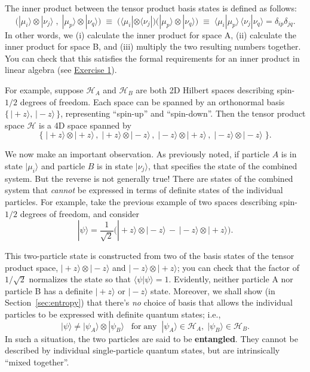 \documentclass[pra,12pt]{revtex4}
\begin{document}
The inner product between the tensor product basis states is defined
as follows:
\begin{equation}
  \Big(|\mu_i\rangle \otimes |\nu_j\rangle\;,\; |\mu_p\rangle \otimes |\nu_q\rangle \Big) \;\equiv\; \Big(\langle\mu_i| \otimes \langle\nu_j| \Big) \Big(|\mu_p\rangle \otimes |\nu_q\rangle\Big) \;\equiv\; \langle\mu_i|\mu_p\rangle \, \langle\nu_j|\nu_q\rangle = \delta_{ip}\delta_{jq}.
\end{equation}
In other words, we (i) calculate the inner product for space A, (ii)
calculate the inner product for space B, and (iii) multiply the two
resulting numbers together.  You can check that this satisfies the
formal requirements for an inner product in linear algebra (see
\hyperref[ex:innerprod]{Exercise 1}).

For example, suppose $\mathscr{H}_A$ and $\mathscr{H}_B$ are both 2D
Hilbert spaces describing spin-$1/2$ degrees of freedom.  Each space
can be spanned by an orthonormal basis $\{\,|\!+\!z\rangle,
\,|\!-\!z\rangle \, \}$, representing ``spin-up'' and ``spin-down''.
Then the tensor product space $\mathscr{H}$ is a 4D space spanned by
\begin{equation*}
  \Big\{\;|\!+\!z\rangle\otimes|\!+\!z\rangle\,,\; |\!+\!z\rangle\otimes|\!-\!z\rangle\,,\; |\!-z\!\rangle\otimes|\!+\!z\rangle\,,\; |\!-\!z\rangle\otimes|\!-\!z\rangle \;\Big\}.
\end{equation*}

We now make an important observation.  As previously noted, if
particle $A$ is in state $|\mu_i\rangle$ and particle $B$ is in state
$|\nu_j\rangle$, that specifies the state of the combined system.  But
the reverse is not generally true!  There are states of the combined
system that \textit{cannot} be expressed in terms of definite states
of the individual particles.  For example, take the previous example
of two spaces describing spin-$1/2$ degrees of freedom, and consider
\begin{equation}
  |\psi\rangle = \frac{1}{\sqrt{2}} \Big(|\!+\!z\rangle\otimes|\!-\!z\rangle \,-\, |\!-\!z\rangle\otimes|\!+\!z\rangle\Big).
\end{equation}

This two-particle state is constructed from two of the basis states of
the tensor product space, $|\!+\!z\rangle\otimes|\!-\!z\rangle$ and
$|\!-\!z\rangle\otimes|\!+\!z\rangle$; you can check that the factor
of $1/\sqrt{2}$ normalizes the state so that $\langle\psi|\psi\rangle
= 1$.  Evidently, neither particle A nor particle B has a definite
$|\!+\!z\rangle$ or $|\!-\!z\rangle$ state.  Moreover, we shall show
(in Section~\ref{sec:entropy}) that there's \textit{no} choice of
basis that allows the individual particles to be expressed with
definite quantum states; i.e.,
\begin{equation}
  |\psi\rangle \ne |\psi_A\rangle\otimes|\psi_B\rangle \;\;\;\textrm{for}\;\textrm{any}\;\; |\psi_A\rangle \in \mathscr{H}_A, \;|\psi_B\rangle \in \mathscr{H}_B.
\end{equation}
In such a situation, the two particles are said to be
\textbf{entangled}.  They cannot be described by individual
single-particle quantum states, but are intrinsically ``mixed
together''.
\end{document}
